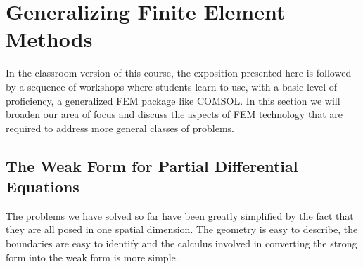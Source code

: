 \section{Generalizing Finite Element Methods}
In the classroom version of this course, the exposition presented here is followed by a sequence of workshops where students learn to use, with a basic level of proficiency, a generalized FEM package like COMSOL.  In this section we will broaden our area of focus and discuss the aspects of FEM technology that are required to address more general classes of problems.

\subsection{The Weak Form for Partial Differential Equations}
The problems we have solved so far have been greatly simplified by the fact that they are all posed in one spatial dimension.  The geometry is easy to describe, the boundaries are easy to identify and the calculus involved in converting the strong form into the weak form is more simple. 

